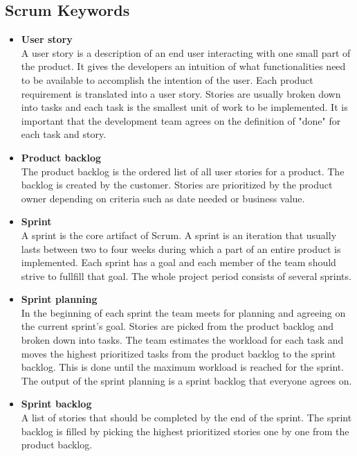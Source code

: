 \subsection{Scrum Keywords}
\begin{itemize}
\item{\textbf{User story}}\\
A user story is a description of an end user interacting with one small part
of the product. It gives the developers an intuition of what functionalities need to be available
to accomplish the intention of the user.
Each product requirement is translated into a user story. Stories are usually
broken down into tasks and each task is the smallest unit of work to be implemented.
It is important that the development team agrees on the definition of "done" for each task and story.

\item{\textbf{Product backlog}}\\
The product backlog is the ordered list of all user stories for a product. The backlog
is created by the customer.
Stories are prioritized by the product owner depending on criteria such as date needed or business value.

\item{\textbf{Sprint}}\\
A sprint is the core artifact of Scrum. A sprint is an iteration that usually lasts between two to four weeks
during which a part of an entire product is implemented. Each sprint has a goal and each member of
the team should strive to fullfill that goal. The whole project period consists of several sprints.

\item{\textbf{Sprint planning}}\\
In the beginning of each sprint the team meets for planning and agreeing on the current sprint's goal.
Stories are picked from the product backlog and broken down into tasks. The team estimates the workload
for each task and moves the highest prioritized tasks from the product backlog to the
sprint backlog. This is done until the maximum workload is reached for the sprint. The output of the sprint planning
is a sprint backlog that everyone agrees on. 

\item{\textbf{Sprint backlog}}\\
A list of stories that should be completed by the end of the sprint. The sprint backlog is filled by picking the highest 
prioritized stories one by one from the product backlog. 


\end{itemize}
